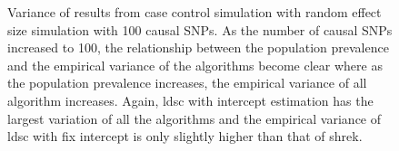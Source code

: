 \begin{figure}
{				
				\label{fig:ldscInCCRandVar}
			}
			\caption[Variance of Case Control Simulation Results (100 Causal)]
			{Variance of results from case control simulation with random effect size simulation with 100 causal \glspl{SNP}.
				As the number of causal \glspl{SNP} increased to 100, the relationship between the population prevalence and the empirical variance of the algorithms become clear where as the population prevalence increases, the empirical variance of all algorithm increases.
				Again, \gls{ldsc} with intercept estimation has the largest variation of all the algorithms and the empirical variance of \gls{ldsc} with fix intercept is only slightly higher than that of \gls{shrek}.
			} 
			\label{fig:CCRandVar}
		\end{figure}
		
